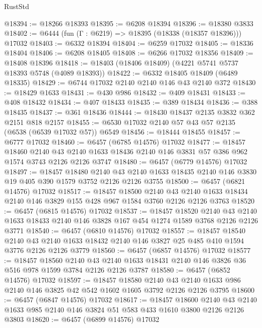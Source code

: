 \begin{lexlean}{RustStd}
\begin{coremodule}
@18394 := @18266 @18393
@18395 := @6208 @18394
@18396 := @18380 @3833
@18402 := @6444 (fun (Γ : @6219) => @18395 (@18338 (@18357 @18396))) @17032
@18403 := @6332 @18394
@18404 := @6259 @17032
@18405 := @18336 @18404
@18406 := @6208 @18405
@18408 := @6266 @17032 @18356
@18409 := @18408 @18396
@18418 := @18403 (@18406 @18409) (@4221 @5741 @5737 @18393 @5748 (@4089 @18393))
@18422 := @6332 @18405 @18409 (@6489 @18335)
@18429 := @6744 @17032 @2140 @2140 @146 @43 @2140 @372
@18430 := @18429 @1633
@18431 := @430 @986
@18432 := @409 @18431
@18433 := @408 @18432
@18434 := @407 @18433
@18435 := @389 @18434
@18436 := @388 @18435
@18437 := @361 @18436
@18444 := @18430 @18437 @2135 @3832 @362 @2151 @818 @2157
@18455 := @6530 @17032 @2140 @57 @43 @57 @2135 (@6538 (@6539 @17032 @57)) @6549
@18456 := @18444 @18455
@18457 := @6777 @17032
@18460 := @6457 (@6785 @14576) @17032
@18477 := @18457
    @18460
    @2140
    @43
    @2140
    @1633
    @18436
    @2140
    @146
    @3831
    @57
    @386
    @962
    @1574
    @3743
    @2126
    @2126
    @3747
@18480 := @6457 (@6779 @14576) @17032
@18497 := @18457
    @18480
    @2140
    @43
    @2140
    @1633
    @18435
    @2140
    @146
    @3830
    @19
    @405
    @390
    @1579
    @3752
    @2126
    @2126
    @3755
@18500 := @6457 (@6821 @14576) @17032
@18517 := @18457
    @18500
    @2140
    @43
    @2140
    @1633
    @18434
    @2140
    @146
    @3829
    @155
    @428
    @967
    @1584
    @3760
    @2126
    @2126
    @3763
@18520 := @6457 (@6815 @14576) @17032
@18537 := @18457
    @18520
    @2140
    @43
    @2140
    @1633
    @18433
    @2140
    @146
    @3828
    @167
    @454
    @1274
    @1589
    @3768
    @2126
    @2126
    @3771
@18540 := @6457 (@6810 @14576) @17032
@18557 := @18457
    @18540
    @2140
    @43
    @2140
    @1633
    @18432
    @2140
    @146
    @3827
    @25
    @485
    @410
    @1594
    @3776
    @2126
    @2126
    @3779
@18560 := @6457 (@6857 @14576) @17032
@18577 := @18457
    @18560
    @2140
    @43
    @2140
    @1633
    @18431
    @2140
    @146
    @3826
    @36
    @516
    @978
    @1599
    @3784
    @2126
    @2126
    @3787
@18580 := @6457 (@6852 @14576) @17032
@18597 := @18457
    @18580
    @2140
    @43
    @2140
    @1633
    @986
    @2140
    @146
    @3825
    @42
    @542
    @1602
    @1605
    @3792
    @2126
    @2126
    @3795
@18600 := @6457 (@6847 @14576) @17032
@18617 := @18457
    @18600
    @2140
    @43
    @2140
    @1633
    @985
    @2140
    @146
    @3824
    @51
    @583
    @433
    @1610
    @3800
    @2126
    @2126
    @3803
@18620 := @6457 (@6899 @14576) @17032

\end{coremodule}
\end{lexlean}
